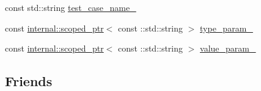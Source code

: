 \begin{DoxyCompactItemize}
\item 
const std\+::string \mbox{\hyperlink{classtesting_1_1_test_info_a3dcf626bbfc3756103be329c05377a5f}{test\+\_\+case\+\_\+name\+\_\+}}
\item 
const \mbox{\hyperlink{classtesting_1_1internal_1_1scoped__ptr}{internal\+::scoped\+\_\+ptr}}$<$ const \+::std\+::string $>$ \mbox{\hyperlink{classtesting_1_1_test_info_ab4f53cfaf59e1b5cac858a9322697e88}{type\+\_\+param\+\_\+}}
\item 
const \mbox{\hyperlink{classtesting_1_1internal_1_1scoped__ptr}{internal\+::scoped\+\_\+ptr}}$<$ const \+::std\+::string $>$ \mbox{\hyperlink{classtesting_1_1_test_info_ac3dd68ea96ebe82c6eab31e6e730a918}{value\+\_\+param\+\_\+}}
\end{DoxyCompactItemize}
\subsection*{Friends}
